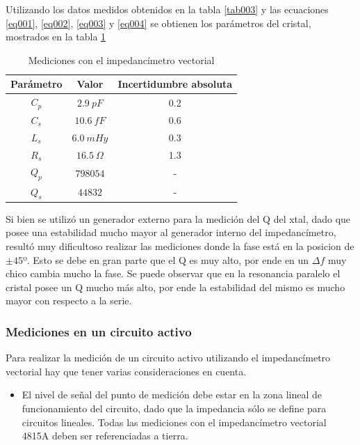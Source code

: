 \documentclass[a4paper,10pt]{article}
\begin{document}
		\indent Utilizando los datos medidos obtenidos en la tabla \ref{tab003}
		y las ecuaciones \ref{eq001}, \ref{eq002}, \ref{eq003} y \ref{eq004} se
		obtienen los parámetros del cristal, mostrados en la tabla \ref{tab004}
		
		\begin{table}[!htp]
			\centering
			\begin{tabular}{|c|c|c|}
				\hline
				Parámetro & Valor & Incertidumbre absoluta \\
				\hline
				$C_p$ & $2.9~pF$ & 0.2 \\
				\hline
				$C_s$ & $10.6~fF$ & 0.6 \\ 
				\hline
				$L_s$ & $6.0~mHy$ & 0.3 \\
				\hline
				$R_s$ & $16.5~\Omega$ & 1.3 \\ 
				\hline									
				$Q_p$ & $798054$ & - \\
				\hline
				$Q_s$ & $44832$  & - \\
				\hline
			\end{tabular}
			\caption{Mediciones con el impedancímetro vectorial} \label{tab004}
		\end{table}	

		\indent Si bien se utilizó un generador externo para la medición del Q 
		del xtal, dado que posee una estabilidad mucho mayor al generador 
		interno del impedancímetro, resultó muy dificultoso realizar las 
		mediciones donde la fase está en la posicion de $\pm45º$. Esto se debe 
		en gran parte que el Q es muy alto, por ende en un $\Delta f$ muy chico 
		cambia mucho la fase. Se puede observar que en la resonancia paralelo el
		cristal posee un Q mucho más alto, por ende la estabilidad del mismo es 
		mucho mayor con respecto a la serie.

		\subsubsection{Mediciones en un circuito activo}
		
		\indent Para realizar la medición de un circuito activo utilizando el 
		impedancímetro vectorial hay que tener varias consideraciones en cuenta.
		
		\begin{itemize}
			\item El nivel de señal del punto de medición debe estar en la zona 
			lineal de funcionamiento del circuito, dado que la impedancia sólo 
			se define para circuitos lineales.
			\indent Todas las mediciones con el impedancímetro vectorial 4815A 
			deben ser referenciadas a tierra.
		\end{itemize}
		
\end{document}
